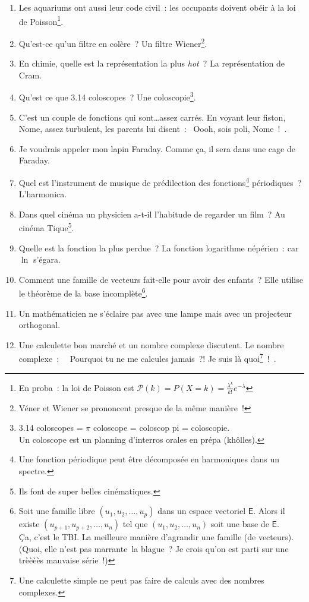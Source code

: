 \documentclass[10pt,a5paper,fullpage]{book}
\begin{document}
\begin{enumerate}
		\item Les aquariums ont aussi leur code civil~: les occupants doivent obéir à la loi de Poisson\footnote{En proba~: la loi de Poisson est $\mathcal{P}(k) = P(X = k) = \frac{\lambda^{k}}{k!}e^{-\lambda}$}.
		\item Qu’est-ce qu’un filtre en colère~? Un filtre Wiener\footnote{Véner et Wiener se prononcent presque de la même manière~!}.
		\item En chimie, quelle est la représentation la plus \textit{hot}~? La représentation de Cram.
		\item Qu’est ce que 3.14 coloscopes~? Une coloscopie\footnote{3.14 coloscopes = $\pi$ coloscope = coloscop pi = coloscopie. \\Un coloscope est un planning d’interros orales en prépa (khôlles).}.
		\item C’est un couple de fonctions qui sont\ldots assez carrés. En voyant leur fiston, Nome, assez turbulent, les parents lui disent~: \guillemotleft~Oooh, sois poli, Nome~!~\guillemotright.
		\item Je voudrais appeler mon lapin Faraday. Comme ça, il sera dans une cage de Faraday.
		\item Quel est l’instrument de musique de prédilection des fonctions\footnote{Une fonction périodique peut être décomposée en harmoniques dans un spectre.} périodiques~? L’harmonica.
		\item Dans quel cinéma un physicien a-t-il l’habitude de regarder un film~? Au cinéma Tique\footnote{Ils font de super belles cinématiques.}.
		\item Quelle est la fonction la plus perdue~? La fonction logarithme népérien~: car $\ln$ s’égara.
		\item Comment une famille de vecteurs fait-elle pour avoir des enfants~? Elle utilise le théorème de la base incomplète\footnote{Soit une famille libre $(u_{1}, u_{2}, \ldots, u_{p})$ dans un espace vectoriel $\mathsf{E}$. Alors il existe $(u_{p+1}, u_{p+2}, \ldots, u_{n})$ tel que $(u_{1}, u_{2}, \ldots, u_{n})$ soit une base de $\mathsf{E}$. \\Ça, c’est le TBI. La meilleure manière d’agrandir une famille (de vecteurs). \\(Quoi, elle n’est pas marrante la blague~? Je crois qu’on est parti sur une trèèèès mauvaise série~!)}.
		\item Un mathématicien ne s’éclaire pas avec une lampe mais avec un projecteur orthogonal.
		\item Une calculette bon marché et un nombre complexe discutent. Le nombre complexe~: \guillemotleft~ Pourquoi tu ne me calcules jamais~?! Je suis là quoi\footnote{Une calculette simple ne peut pas faire de calculs avec des nombres complexes.}~!~\guillemotright.

\end{enumerate}
\end{document}
